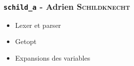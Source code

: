 \subsubsection{\texttt{schild\_a} - Adrien \textsc{Schildknecht}}

\begin{itemize}
    \item Lexer et parser
    \item Getopt
    \item Expansions des variables
\end{itemize}
